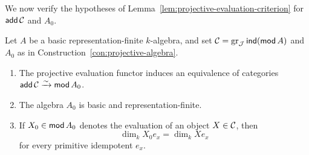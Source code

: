 We now verify the hypotheses of Lemma~\ref{lem:projective-evaluation-criterion}
for $\operatorname{\mathsf{add}}\mathcal C$ and $A_0$.

\begin{proposition}
\label{prop:projective-evaluation}
Let $A$ be a basic representation-finite $k$-algebra, and set
$\mathcal C=\operatorname{gr}_\mathcal J\operatorname{\mathsf{ind}}(\operatorname{\mathsf{mod}} A)$ and $A_0$ as in
Construction~\ref{con:projective-algebra}.
\begin{enumerate}[label={\upshape(\arabic*)}]
\item The projective evaluation functor induces an equivalence of categories
$\operatorname{\mathsf{add}}\mathcal C\xrightarrow{\sim}\operatorname{\mathsf{mod}} A_0$.
\item The algebra $A_0$ is basic and representation-finite.
\item If $X_0\in\operatorname{\mathsf{mod}} A_0$ denotes the evaluation of an object $X\in\mathcal C$, then
\[
                         \dim_k X_0e_x=\dim_k Xe_x
\]
for every primitive idempotent $e_x$.
\end{enumerate}
\end{proposition}
